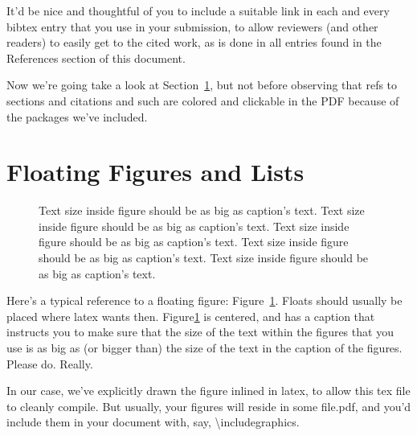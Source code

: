 It'd be nice and thoughtful of you to include a suitable link in each
and every bibtex entry that you use in your submission, to allow
reviewers (and other readers) to easily get to the cited work, as is
done in all entries found in the References section of this document.

Now we're going take a look at Section~\ref{sec:figs}, but not before
observing that refs to sections and citations and such are colored and
clickable in the PDF because of the packages we've included.

\section{Floating Figures and Lists}
\label{sec:figs}


\begin{figure}
\begin{center}
\end{center}
\caption{\label{fig:vectors} Text size inside figure should be as big as
  caption's text. Text size inside figure should be as big as
  caption's text. Text size inside figure should be as big as
  caption's text. Text size inside figure should be as big as
  caption's text. Text size inside figure should be as big as
  caption's text. }
\end{figure}


Here's a typical reference to a floating figure:
Figure~\ref{fig:vectors}. Floats should usually be placed where latex
wants then. Figure\ref{fig:vectors} is centered, and has a caption
that instructs you to make sure that the size of the text within the
figures that you use is as big as (or bigger than) the size of the
text in the caption of the figures. Please do. Really.

In our case, we've explicitly drawn the figure inlined in latex, to
allow this tex file to cleanly compile. But usually, your figures will
reside in some file.pdf, and you'd include them in your document
with, say, \textbackslash{}includegraphics.

